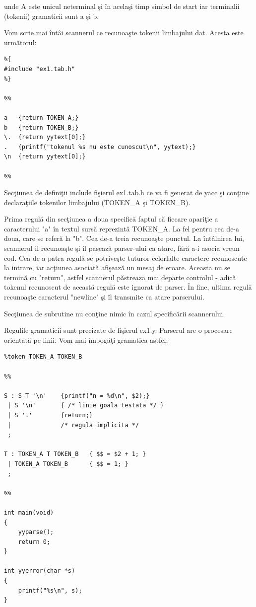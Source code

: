 unde A este unicul neterminal \c{s}i \^{i}n acela\c{s}i timp simbol de start iar terminalii (tokenii) gramaticii sunt a \c{s}i b.

Vom scrie mai \^{i}nt\^{a}i scannerul ce recunoa\c{s}te tokenii limbajului dat. Acesta este urm\u{a}torul:
\begin{verbatim}
%{
#include "ex1.tab.h"
%}

%%

a	{return TOKEN_A;}
b	{return TOKEN_B;}
\.	{return yytext[0];}
.	{printf("tokenul %s nu este cunoscut\n", yytext);}
\n	{return yytext[0];}

%%
\end{verbatim}

Sec\c{t}iunea de defini\c{t}ii include fi\c{s}ierul ex1.tab.h ce va fi generat de yacc \c{s}i con\c{t}ine declara\c{t}iile tokenilor limbajului (TOKEN\_A \c{s}i TOKEN\_B).

Prima regul\u{a} din sec\c{t}iunea a doua specific\u{a} faptul c\u{a} fiecare apari\c{t}ie a caracterului "a" \^{i}n textul surs\u{a} reprezint\u{a} TOKEN\_A. La fel pentru cea de-a doua, care se refer\u{a} la "b". Cea de-a treia recunoa\c{s}te punctul. La \^{i}nt\^{a}lnirea lui, scannerul il recunoa\c{s}te \c{s}i \^{i}l paseaz\u{a} parser-ului ca atare, f\u{a}r\u{a} a-i asocia vreun cod. Cea de-a patra regul\u{a} se potrive\c{s}te tuturor celorlalte caractere recunoscute la intrare, iar ac\c{t}iunea asociat\u{a} afi\c{s}eaz\u{a} un mesaj de eroare. Aceasta nu se termin\u{a} cu "return", astfel scannerul p\u{a}streaza mai departe controlul - adic\u{a} tokenul recunoscut de aceast\u{a} regul\u{a} este ignorat de parser. \^{I}n fine, ultima regul\u{a} recunoa\c{s}te caracterul "newline" \c{s}i \^{i}l transmite ca atare parserului.

Sec\c{t}iunea de subrutine nu con\c{t}ine nimic \^{i}n cazul specific\u{a}rii scannerului.

Regulile gramaticii sunt precizate de fi\c{s}ierul ex1.y. Parserul are o procesare orientat\u{a} pe linii. Vom mai \^{i}mbog\u{a}\c{t}i gramatica astfel:

\begin{verbatim}
%token TOKEN_A TOKEN_B

%%

S : S T '\n'	{printf("n = %d\n", $2);}
 | S '\n'		{ /* linie goala testata */ }
 | S '.'		{return;}
 |				/* regula implicita */
 ;

T : TOKEN_A T TOKEN_B	{ $$ = $2 + 1; }
 | TOKEN_A TOKEN_B		{ $$ = 1; }
 ;
 
%%

int main(void)
{
	yyparse();
	return 0;
}

int yyerror(char *s)
{
	printf("%s\n", s);
}
\end{verbatim}

